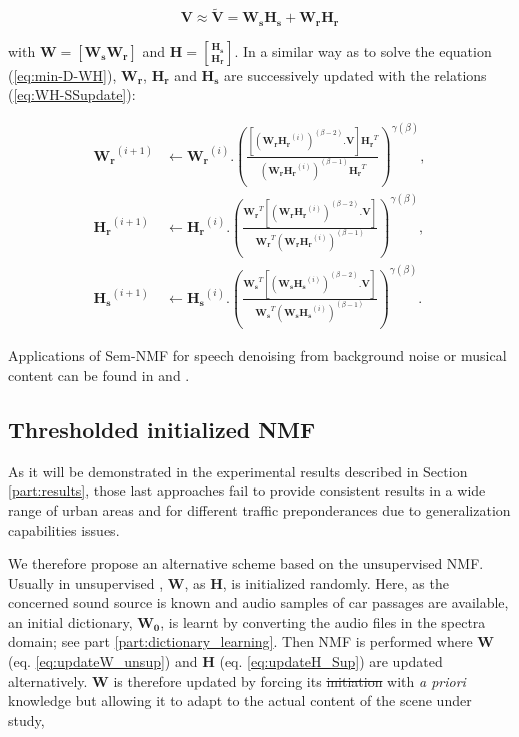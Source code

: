 \documentclass[twocolumn]{svjour3}          %
\providecommand{\DIFaddtex}[1]{{\protect\color{blue}\uwave{#1}}} %
\providecommand{\DIFdeltex}[1]{{\protect\color{red}\sout{#1}}}                      %
\providecommand{\DIFaddbegin}{} %
\providecommand{\DIFaddend}{} %
\providecommand{\DIFdelbegin}{} %
\providecommand{\DIFdelend}{} %
\providecommand{\DIFadd}[1]{\texorpdfstring{\DIFaddtex{#1}}{#1}} %
\providecommand{\DIFdel}[1]{\texorpdfstring{\DIFdeltex{#1}}{}} %
\begin{document}
\begin{equation}
\mathbf{V} \approx \mathbf{\tilde{V}} = \mathbf{W_s H_s}+ \mathbf{W_r H_r}
\end{equation}

 with $\mathbf{W} = \left[\mathbf{W_s} \mathbf{W_r} \right]$ and $\mathbf{H} = \genfrac[]{0pt}{0}{\mathbf{H_s}}{\mathbf{H_r}}$. In a similar way as to solve the equation (\ref{eq:min-D-WH}), $\mathbf{W_r}$, $\mathbf{H_r}$ and $\mathbf{H_s}$ are successively updated with the relations (\ref{eq:WH-SSupdate}):

{\scriptsize
\begin{subequations}\label{eq:WH-SSupdate}
\begin{align}
\mathbf{W_r}^{(i+1)} &\leftarrow \mathbf{W_r}^{(i)}.\left(\frac{\left[\left(\mathbf{W_r H_r}^{(i)} \right)^{(\beta-2)}.\mathbf{V} \right]\mathbf{H_r}^T}{\left(\mathbf{W_r H_r}^{(i)} \right)^{(\beta-1)}\mathbf{H_r}^T}\right)^{\gamma(\beta)}, \label{eq:W_r_SS}\\
\mathbf{H_r}^{(i+1)} &\leftarrow \mathbf{H_r}^{(i)}.\left(\frac{\mathbf{W_r}^T \left[\left(\mathbf{W_r H_r}^{(i)} \right)^{(\beta-2)}.\mathbf{V} \right]}{\mathbf{W_r}^T \left(\mathbf{W_r H_r}^{(i)} \right)^{(\beta-1)}}\right)^{\gamma(\beta)}, \label{eq:H_r_SS}\\
\mathbf{H_s}^{(i+1)} &\leftarrow \mathbf{H_s}^{(i)}.\left(\frac{\mathbf{W_s}^T \left[\left(\mathbf{W_s H_s}^{(i)} \right)^{(\beta-2)}.\mathbf{V} \right]}{\mathbf{W_s}^T \left(\mathbf{W_s H_s}^{(i)} \right)^{(\beta-1)}}\right)^{\gamma(\beta)}.\label{eq:H_s_SS}
\end{align}
\end{subequations}}

Applications of Sem-NMF for speech denoising from background noise or musical content can be found in \cite{joder2012real} and \cite{weninger2012supervised}.

\subsection{Thresholded initialized NMF}

As it will be demonstrated in the experimental results described in Section \ref{part:results}, those last approaches fail to provide consistent results in a wide range of urban areas and for different traffic preponderances due to generalization capabilities issues.

We therefore propose an alternative scheme based on the unsupervised NMF. Usually in unsupervised \DIFaddbegin \DIFadd{learning}\DIFaddend , $\mathbf{W}$, as  $\mathbf{H}$, is initialized randomly. Here, as the concerned sound source is known and audio samples of car passages are available, an initial dictionary, $\mathbf{W_0}$, is learnt by converting the audio files in the spectra domain; see part \ref{part:dictionary_learning}. Then NMF is performed where $\mathbf{W}$ (eq. \ref{eq:updateW_unsup}) and $\mathbf{H}$ (eq.  \ref{eq:updateH_Sup}) are updated alternatively. $\mathbf{W}$ is therefore updated by forcing its \DIFdelbegin \DIFdel{initiation }\DIFdelend \DIFaddbegin \DIFadd{initialization }\DIFaddend with \textit{a priori} knowledge but allowing it to adapt to the actual content of the scene under study,
\end{document}
